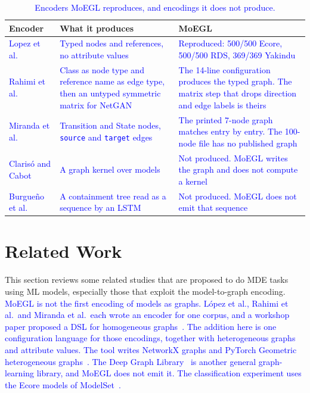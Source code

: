 \documentclass[journal,article,submit,moreauthors,technologies]{Definitions/mdpi}
\newcommand{\rev}[1]{\textcolor{blue}{#1}}
\begin{document}
\begin{table}[H]
\caption{\rev{Encoders MoEGL reproduces, and encodings it does not produce.}\label{tab:coverage}}
\centering
\small
\begin{tabularx}{\textwidth}{lXX}
\toprule
\textbf{Encoder} & \textbf{What it produces} & \textbf{MoEGL} \\
\midrule
\rev{Lopez et al.~\cite{lopez2022generating}} & \rev{Typed nodes and references, no attribute values} & \rev{Reproduced: 500/500 Ecore, 500/500 RDS, 369/369 Yakindu} \\
\rev{Rahimi et al.~\cite{rahimi2023towards}} & \rev{Class as node type and reference name as edge type, then an untyped symmetric matrix for NetGAN} & \rev{The 14-line configuration produces the typed graph. The matrix step that drops direction and edge labels is theirs} \\
\rev{Miranda et al.~\cite{miranda2024towards}} & \rev{Transition and State nodes, \texttt{source} and \texttt{target} edges} & \rev{The printed 7-node graph matches entry by entry. The 100-node file has no published graph} \\
\rev{Claris\'o and Cabot~\cite{clariso2018applying}} & \rev{A graph kernel over models} & \rev{Not produced. MoEGL writes the graph and does not compute a kernel} \\
\rev{Burgue\~no et al.~\cite{burgueno2019lstm}} & \rev{A containment tree read as a sequence by an LSTM} & \rev{Not produced. MoEGL does not emit that sequence} \\
\bottomrule
\end{tabularx}
\end{table}

\section{Related Work} \label{Sec:relatedwork}
This section reviews some related studies that are proposed to do MDE tasks using ML models, especially those that exploit the model-to-graph encoding. \rev{MoEGL is not the first encoding of models as graphs. L\'opez et al., Rahimi et al.\ and Miranda et al.\ each wrote an encoder for one corpus, and a workshop paper proposed a DSL for homogeneous graphs~\cite{rajaei2021dsl}. The addition here is one configuration language for those encodings, together with heterogeneous graphs and attribute values. The tool writes NetworkX graphs and PyTorch Geometric heterogeneous graphs~\cite{fey2019fast}. The Deep Graph Library~\cite{wang2019deep} is another general graph-learning library, and MoEGL does not emit it. The classification experiment uses the Ecore models of ModelSet~\cite{lopez2022modelset}.}
\end{document}
